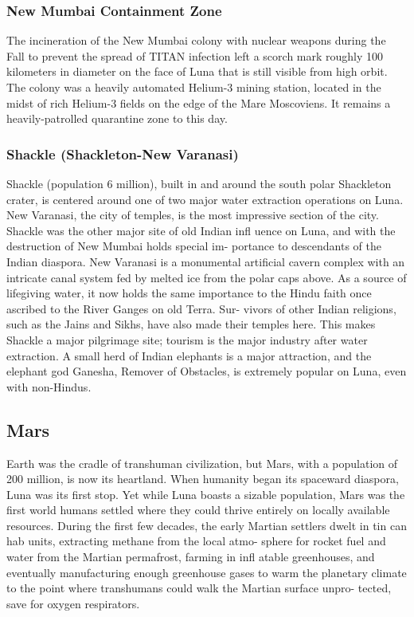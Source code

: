 \subsubsection{New Mumbai Containment Zone}

The incineration of the New Mumbai colony with 
nuclear weapons during the Fall to prevent the spread 
of TITAN infection left a scorch mark roughly 100 
kilometers in diameter on the face of Luna that is 
still visible from high orbit. The colony was a heavily 
automated Helium-3 mining station, located in the 
midst of rich Helium-3 fields on the edge of the Mare 
Moscoviens. It remains a heavily-patrolled quarantine 
zone to this day.

\subsubsection{Shackle (Shackleton-New Varanasi)}

Shackle (population 6 million), built in and around 
the south polar Shackleton crater, is centered around 
one of two major water extraction operations on 
Luna. New Varanasi, the city of temples, is the most 
impressive section of the city. Shackle was the other 
major site of old Indian infl uence on Luna, and with 
the destruction of New Mumbai holds special im-
portance to descendants of the Indian diaspora. New 
Varanasi is a monumental artificial cavern complex 
with an intricate canal system fed by melted ice from 
the polar caps above. As a source of lifegiving water, 
it now holds the same importance to the Hindu faith 
once ascribed to the River Ganges on old Terra. Sur-
vivors of other Indian religions, such as the Jains and 
Sikhs, have also made their temples here. This makes 
Shackle a major pilgrimage site; tourism is the major 
industry after water extraction. A small herd of Indian 
elephants is a major attraction, and the elephant god 
Ganesha, Remover of Obstacles, is extremely popular 
on Luna, even with non-Hindus.

\subsection{Mars}

Earth was the cradle of transhuman civilization, 
but Mars, with a population of 200 million, is now 
its heartland. When humanity began its spaceward 
diaspora, Luna was its first stop. Yet while Luna 
boasts a sizable population, Mars was the first world 
humans settled where they could thrive entirely 
on locally available resources. During the first few 
decades, the early Martian settlers dwelt in tin can 
hab units, extracting methane from the local atmo-
sphere for rocket fuel and water from the Martian 
permafrost, farming in infl atable greenhouses, and 
eventually manufacturing enough greenhouse gases 
to warm the planetary climate to the point where 
transhumans could walk the Martian surface unpro-
tected, save for oxygen respirators.

